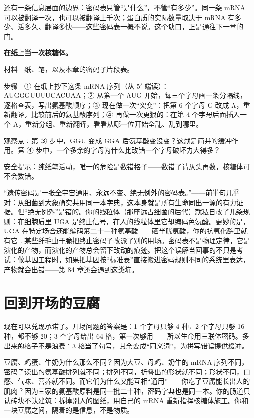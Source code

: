 还有一条信息层面的边界：密码表只管“是什么”，不管“有多少”。同一条 mRNA 可以被翻译一次，也可以被翻译上千次；蛋白质的实际数量取决于 mRNA 有多少、活多久、翻译多快——这些密码表一概不说。这个缺口，正是通往下一章的门。

\begin{shiyan}
\textbf{在纸上当一次核糖体。}

材料：纸、笔，以及本章的密码子片段表。

步骤：① 在纸上抄下这条 mRNA 序列（从 $5'$ 端读）：AUGGGUUUUCACUAA；② 从第一个 AUG 开始，每三个字母画一条分隔线，逐格查表，写出氨基酸顺序；③ 现在做一次“突变”：把第 6 个字母 G 改成 A，重新翻译，比较前后的氨基酸序列；④ 再做一次更狠的：在第 4 个字母后面插入一个 A，重新分组、重新翻译，看看从哪一位开始全乱、乱到哪里。

观察点：第 ③ 步中，GGU 变成 GGA 后氨基酸变没变？这就是简并的缓冲作用。第 ④ 步中，一个多余的字母为什么比改错一个字母破坏力大得多？

安全提示：纯纸笔活动，唯一的危险是数错格子——数错了请从头再数，核糖体可不会数错。
\end{shiyan}

\begin{wuqu}
“遗传密码是一张全宇宙通用、永远不变、绝无例外的密码表。”——前半句几乎对：从细菌到大象确实共用同一本字典，这本身就是所有生命同出一源的有力证据。但“绝无例外”是错的。你的线粒体（那座远古细菌的后代）就私自改了几条规则：在细胞质里 UGA 是终止信号，在人的线粒体里它却编码色氨酸。更妙的是，UGA 在特定场合还能编码第二十一种氨基酸——硒半胱氨酸，你的抗氧化酶里就有它；某些纤毛虫干脆把终止密码子改派了别的用场。密码表不是物理定律，它是演化的产物，而演化的产物总会留下改动的痕迹。把这个误解当回事的不只是考试：做基因工程时，如果把基因按“标准表”直接搬进密码规则不同的系统里表达，产物就会出错——第 84 章还会遇到这类坑。
\end{wuqu}

\section{回到开场的豆腐}

现在可以兑现承诺了。开场问题的答案是：1 个字母只够 4 种，2 个字母只够 16 种，都不够 20；3 个字母给出 64 格，第一次够用——所以生命用三联体密码。多出来的格子不是浪费：3 格当了句号，其余变成“同义词”，为拼写错误提供缓冲。

豆腐、鸡蛋、牛奶为什么那么不同？因为大豆、母鸡、奶牛的 mRNA 序列不同，密码子读出的氨基酸排列就不同；排列不同，折叠出的形状就不同；形状不同，口感、气味、营养就不同。而它们为什么又能互相“通用”——你吃了豆腐能长出人的肌肉？因为三家的氨基酸原料是同一批二十种，密码字典也是同一本。你的肠道只认砖块不认建筑：拆掉别人的图纸，用自己的 mRNA 重新指挥核糖体施工。你和一块豆腐之间，隔着的是信息，不是物质。

